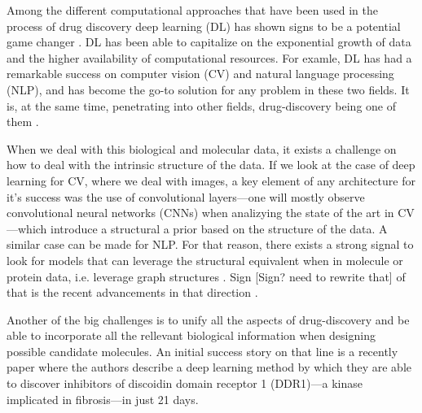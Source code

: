 \documentclass{article}
\begin{document}


Among the different computational approaches that have been used in the process of drug
 discovery deep learning (DL) has shown signs to be a potential game changer
 \cite{Dargan2019}. DL has been able to capitalize on the exponential growth of data and
 the higher availability of computational resources. For examle, DL has had a remarkable
 success on computer vision (CV) and natural language processing (NLP), and has become
 the go-to solution for any problem in these two fields. It is, at the same time,
 penetrating into other fields, drug-discovery being one of them \cite{Chen2018}. 

When we deal with this biological and molecular data, it exists a challenge on how to
 deal with the intrinsic structure of the data.
 If we look at the case of deep learning for CV, where we deal with images, a key
 element of any architecture for it's success was the use of convolutional layers---one
 will mostly observe convolutional neural networks (CNNs) when analizying the state of
 the art in CV---which introduce a structural a prior based on the structure of the
 data. A similar case can be made for NLP. For that reason, there exists a strong signal
 to look for models that can leverage the structural equivalent when in molecule or
 protein data, i.e. leverage graph structures \cite{Wu2019}. Sign [Sign? need to rewrite that] of that
 is the recent advancements in that direction \cite{Sun2019}.
 

Another of the big challenges is to unify all the aspects of drug-discovery and be able
 to incorporate all the rellevant biological information when designing possible
 candidate molecules. An initial success story on that line is a recently paper
 \cite{Zhavoronkov2019} where the authors describe a deep learning method by which they
 are able to discover inhibitors of discoidin domain receptor 1 (DDR1)—a kinase
 implicated in fibrosis—in just 21 days.
\end{document}

